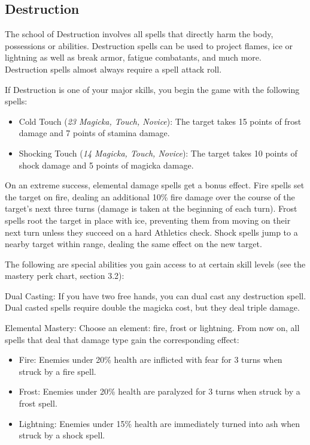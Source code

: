 \documentclass[12pt]{book}
\begin{document}
\subsection{Destruction}

The school of Destruction involves all spells that directly harm the body, possessions or abilities. Destruction spells can be used to project flames, ice or lightning as well as break armor, fatigue combatants, and much more. Destruction spells almost always require a spell attack roll.

If Destruction is one of your major skills, you begin the game with the following spells:
\begin{itemize}
	\item Cold Touch (\textit{23 Magicka, Touch, Novice}): The target takes 15 points of frost damage and 7 points of stamina damage.
	\item Shocking Touch (\textit{14 Magicka, Touch, Novice}): The target takes 10 points of shock damage and 5 points of magicka damage.
\end{itemize}

On an extreme success, elemental damage spells get a bonus effect. Fire spells set the target on fire, dealing an additional 10\% fire damage over the course of the target's next three turns (damage is taken at the beginning of each turn). Frost spells root the target in place with ice, preventing them from moving on their next turn unless they succeed on a hard Athletics check. Shock spells jump to a nearby target within range, dealing the same effect on the new target.

The following are special abilities you gain access to at certain skill levels (see the mastery perk chart, section 3.2):

Dual Casting: If you have two free hands, you can dual cast any destruction spell. Dual casted spells require double the magicka cost, but they deal triple damage.

Elemental Mastery: Choose an element: fire, frost or lightning. From now on, all spells that deal that damage type gain the corresponding effect:

\begin{itemize}
	\item Fire: Enemies under 20\% health are inflicted with fear for 3 turns when struck by a fire spell.
	\item Frost: Enemies under 20\% health are paralyzed for 3 turns when struck by a frost spell.
	\item Lightning: Enemies under 15\% health are immediately turned into ash when struck by a shock spell.
\end{itemize}
\end{document}

